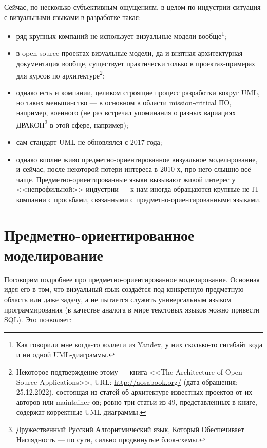 \documentclass{text-style}
\begin{document}

Сейчас, по несколько субъективным ощущениям, в целом по индустрии ситуация с визуальными языками в разработке такая:

\begin{itemize}
    \item ряд крупных компаний не использует визуальные модели вообще\footnote{Как говорили мне когда-то коллеги из Yandex, у них сколько-то гигабайт кода и ни одной UML-диаграммы.};
    \item в open-source-проектах визуальные модели, да и внятная архитектурная документация вообще, существует практически только в проектах-примерах для курсов по архитектуре\footnote{Некоторое подтверждение этому --- книга <<The Architecture of Open Source Applications>>, URL: \url{http://aosabook.org/} (дата обращения: 25.12.2022), состоящая из статей об архитектуре известных проектов от их авторов или maintainer-ов; ровно три статьи из 49, представленных в книге, содержат корректные UML-диаграммы.};
    \item однако есть и компании, целиком строящие процесс разработки вокруг UML, но таких меньшинство --- в основном в области mission-critical ПО, например, военного (не раз встречал упоминания о разных вариациях ДРАКОН\footnote{Дружественный Русский Алгоритмический язык, Который Обеспечивает Наглядность --- по сути, сильно продвинутые блок-схемы.} в этой сфере, например);
    \item сам стандарт UML не обновлялся с 2017 года;
    \item однако вполне живо предметно-ориентированное визуальное моделирование, и сейчас, после некоторой потери интереса в 2010-х, про него слышно всё чаще. Предметно-ориентированные языки вызывают живой интерес у <<непрофильной>> индустрии --- к нам иногда обращаются крупные не-IT-компании с просьбами, связанными с предметно-ориентированными языками.
\end{itemize}


\section{Предметно-ориентированное моделирование}

Поговорим подробнее про предметно-ориентированное моделирование. Основная идея его в том, что визуальный язык создаётся под конкретную предметную область или даже задачу, а не пытается служить универсальным языком программирования (в качестве аналога в мире текстовых языков можно привести SQL). Это позволяет:
\end{document}
